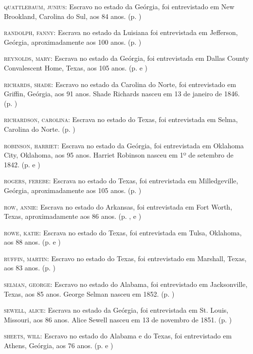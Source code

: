 \begin{Parskip}
\textsc{quattlebaum, junius:} Escravo no estado da Geórgia, foi
entrevistado em New Brookland, Carolina do Sul, aos 84 anos. (p. \pageref{ref220})

\textsc{randolph, fanny:} Escrava no estado da Luisiana foi entrevistada
em Jefferson, Geórgia, aproximadamente aos 100 anos. (p. \pageref{ref221})

\textsc{reynolds, mary:} Escrava no estado da Geórgia, foi entrevistada
em Dallas County Convalescent Home, Texas, aos 105 anos. (p. \pageref{ref222} e \pageref{ref223})

\textsc{richards, shade:} Escravo no estado da Carolina do Norte, foi
entrevistado em Griffin, Geórgia, aos 91 anos. Shade Richards nasceu em
13 de janeiro de 1846. (p. \pageref{ref224})

\textsc{richardson, carolina:} Escrava no estado do Texas, foi
entrevistada em Selma, Carolina do Norte. (p. \pageref{ref225})

\textsc{robinson, harriet:} Escrava no estado da Geórgia, foi
entrevistada em Oklahoma City, Oklahoma, aos 95 anos. Harriet Robinson
nasceu em 1º de setembro de 1842. (p. \pageref{ref226} e \pageref{ref227})

\textsc{rogers, ferebe:} Escrava no estado do Texas, foi entrevistada em
Milledgeville, Geórgia, aproximadamente aos 105 anos. (p. \pageref{ref228})

\textsc{row, annie:} Escrava no estado do Arkansas, foi entrevistada em
Fort Worth, Texas, aproximadamente aos 86 anos. (p. \pageref{ref229}, \pageref{ref230} e \pageref{ref231})

\textsc{rowe, katie:} Escrava no estado do Texas, foi entrevistada em
Tulsa, Oklahoma, aos 88 anos. (p. \pageref{ref232} e \pageref{ref233})

\textsc{ruffin, martin:} Escravo no estado do Texas, foi entrevistado em
Marshall, Texas, aos 83 anos. (p. \pageref{ref234})

\textsc{selman, george:} Escravo no estado do Alabama, foi entrevistado
em Jacksonville, Texas, aos 85 anos. George Selman nasceu em 1852. (p. \pageref{ref235})

\textsc{sewell, alice:} Escrava no estado da Geórgia, foi entrevistada
em St. Louis, Missouri, aos 86 anos. Alice Sewell nasceu em 13 de
novembro de 1851. (p. \pageref{ref236})

\textsc{sheets, will:} Escravo no estado do Alabama e do Texas, foi
entrevistado em Athens, Geórgia, aos 76 anos. (p. \pageref{ref237} e \pageref{ref238})


\end{Parskip}
